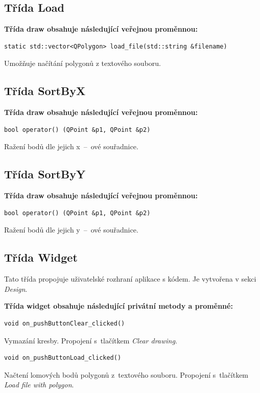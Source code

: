 \documentclass[a4paper, 12pt, oneside, titlepage]{article} %
\begin{document}
\subsection{Třída Load}
\textbf{Třída draw obsahuje následující veřejnou proměnnou:}
\begin{verbatim}
static std::vector<QPolygon> load_file(std::string &filename)
\end{verbatim}
Umožňuje načítání polygonů z textového souboru.\\

\subsection{Třída SortByX}
\textbf{Třída draw obsahuje následující veřejnou proměnnou:}
\begin{verbatim}
bool operator() (QPoint &p1, QPoint &p2)
\end{verbatim}
Ražení bodů dle jejich x~--~ové souřadnice.\\

\subsection{Třída SortByY}
\textbf{Třída draw obsahuje následující veřejnou proměnnou:}
\begin{verbatim}
bool operator() (QPoint &p1, QPoint &p2)
\end{verbatim}
Ražení bodů dle jejich y~--~ové souřadnice.\\

\subsection{Třída Widget}
Tato třída propojuje uživatelské rozhraní aplikace s kódem. Je vytvořena v sekci \emph{Design}.

\textbf{Třída widget obsahuje následující privátní metody a proměnné:}
\begin{verbatim}
void on_pushButtonClear_clicked()
\end{verbatim}
Vymazání kresby. Propojení s~tlačítkem \emph{Clear drawing}.\\

\begin{verbatim}
void on_pushButtonLoad_clicked()
\end{verbatim}
Načtení lomových bodů polygonů z~textového souboru. Propojení s~tlačítkem \emph{Load file with polygon}.\\
\end{document}
